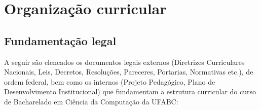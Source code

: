 \section{Organização curricular}
\label{sec:organizacao_curricular}

\subsection{Fundamentação legal}
\label{subsec:fund_legal}

A seguir são elencados os documentos legais externos (Diretrizes
Curriculares Nacionais, Leis, Decretos, Resoluções, Pareceres,
Portarias, Normativas etc.), de ordem federal, bem como os internos
(Projeto Pedagógico, Plano de Desenvolvimento Institucional) que
fundamentam a estrutura curricular do curso de Bacharelado em Ciência
da Computação da UFABC:


